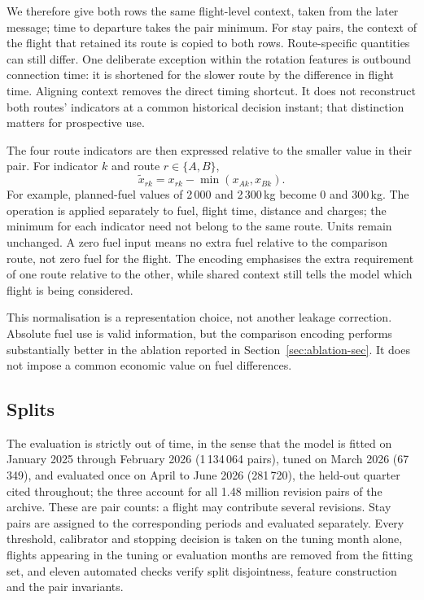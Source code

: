 \documentclass[preprint,authoryear,12pt]{elsarticle}
\begin{document}
We therefore give both rows the same flight-level context, taken from
the later message; time to departure takes the pair minimum. For stay
pairs, the context of the flight that retained its route is copied to
both rows. Route-specific quantities can still differ. One deliberate
exception within the rotation features is outbound connection time:
it is shortened for the slower route by the difference in flight time.
Aligning context removes the direct timing shortcut. It does not
reconstruct both routes' indicators at a common historical decision
instant; that distinction matters for prospective use.

The four route indicators are then expressed relative to the smaller
value in their pair. For indicator $k$ and route $r\in\{A,B\}$,
\begin{equation}
 \widetilde{x}_{rk}=x_{rk}-\min(x_{Ak},x_{Bk}).
\end{equation}
For example, planned-fuel values of 2\,000 and 2\,300\,kg become
0 and 300\,kg. The operation is applied separately to fuel, flight time,
distance and charges; the minimum for each indicator need not belong
to the same route. Units remain unchanged. A zero fuel input means no extra fuel relative
to the comparison route, not zero fuel for the flight. The encoding emphasises the
extra requirement of one route relative to the other, while shared
context still tells the model which flight is being considered.

This normalisation is a representation choice, not another leakage
correction. Absolute fuel use is valid information, but the comparison
encoding performs substantially better in the ablation reported in
Section~\ref{sec:ablation-sec}. It does not impose a common economic value on fuel differences.

\subsection{Splits}
\label{sec:splits}

The evaluation is strictly out of time, in the sense that the model is
fitted on January 2025 through February 2026 (1\,134\,064 pairs),
tuned on March 2026 (67\,349), and evaluated once on April to June 2026
(281\,720), the held-out quarter cited throughout; the three account for
all 1.48 million revision pairs of the archive. These are pair counts:
a flight may contribute several revisions. Stay pairs are assigned to
the corresponding periods and evaluated separately. Every threshold, calibrator and stopping decision is taken on the
tuning month alone, flights appearing in the tuning or evaluation
months are removed from the fitting set, and eleven automated checks
verify split disjointness, feature construction and the pair
invariants.
\end{document}
